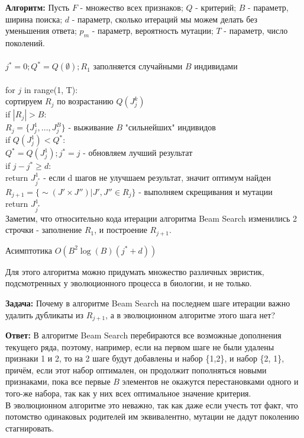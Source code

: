 \textbf{Алгоритм:} Пусть $F$ - множество всех признаков; $Q$ - критерий; $B$ - параметр, ширина поиска; $d$ - параметр, сколько итераций мы можем делать без уменьшения ответа; $p_m$ - параметр, вероятность мутации; $T$ - параметр, число поколений.
\\\\
$j^* = 0; Q^* = Q(\emptyset); R_1$ заполняется случайными $B$ индивидами
\\\\
for $j$ in range(1, T):\\
\indent    сортируем $R_j$ по возрастанию $Q(J_j^{k})$\\
\indent    if $|R_j|>B$:\\
\indent    \indent    $R_j = \{J_j^{1}, ..., J_j^{B}\}$ - выживание $B$ "сильнейших" индивидов\\
\indent    if $Q(J_j^{1})<Q^*$:\\
\indent    \indent    $Q^* = Q(J_j^{1}); j^* = j$ - обновляем лучший результат\\
\indent    if $j-j^* \geq d$:\\
\indent    \indent    return $J_{j^*}^{1}$ - если d шагов не улучшаем результат, значит оптимум найден\\
\indent    $R_{j+1} = \{ \sim(J' \times J'') | J', J'' \in R_j\}$ - выполняем скрещивания и мутации\\
return $J_{j^*}^{1}$\\

Заметим, что относительно кода итерации алгоритма Beam Search изменились 2 строчки - заполнение $R_1$, и построение $R_{j+1}$.

Асимптотика $O(B^2\log(B) (j^*+d) )$

Для этого алгоритма можно придумать множество различных эвристик, подсмотренных у эволюционного процесса в биологии, и не только.

\textbf{Задача:} Почему в алгоритме Beam Search на последнем шаге итерации важно удалить дубликаты из $R_{j+1}$, а в эволюционном алгоритме этого шага нет?

\textbf{Ответ:} В алгоритме Beam Search перебираются все возможные дополнения текущего ряда, поэтому, например, если на первом шаге не были удалены признаки 1 и 2, то на 2 шаге будут добавлены и набор \{1,2\}, и набор \{2, 1\},
причём, если этот набор оптимален, он продолжит пополняться новыми признаками, пока все первые $B$ элементов не окажутся перестановками одного и того-же набора, так как у них всех оптимальное значение критерия.\\
В эволюционном алгоритме это неважно, так как даже если учесть тот факт, что потомство одинаковых родителей им эквивалентно, мутации не дадут поколению стагнировать.

